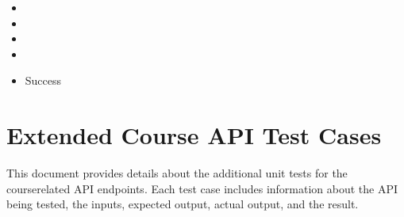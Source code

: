 \documentclass[letterpaper,10pt,english]{sphinxmanual}
\begin{document}
\subsection{}
\label{\detokenize{src/authTestCases:test-case-test-verify-token-invalid}}\begin{itemize}
\item {} 
\sphinxAtStartPar
{} 

\item {} 
\sphinxAtStartPar
{}

\begin{sphinxVerbatim}[commandchars=\\\{\}]
\end{sphinxVerbatim}

\item {} 
\sphinxAtStartPar
{}

\begin{sphinxVerbatim}[commandchars=\\\{\}]
\end{sphinxVerbatim}

\item {} 
\sphinxAtStartPar
{}

\begin{sphinxVerbatim}[commandchars=\\\{\}]
\end{sphinxVerbatim}

\item {} 
\sphinxAtStartPar
{} Success

\end{itemize}

\sphinxstepscope


\chapter{Extended Course API Test Cases}
\label{\detokenize{src/adminTestCases:extended-course-api-test-cases}}\label{\detokenize{src/adminTestCases::doc}}
\sphinxAtStartPar
This document provides details about the additional unit tests for the course\sphinxhyphen{}related API endpoints. Each test case includes information about the API being tested, the inputs, expected output, actual output, and the result.
\end{document}
